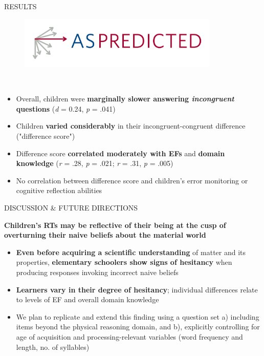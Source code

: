\documentclass[final]{beamer}
\newlength{\colwidth}
\newlength{\widecolwidth}
\begin{document}
\begin{frame}[t]
\begin{columns}[t]
\begin{column}{\widecolwidth}
\begin{block}{RESULTS}
\begin{minipage}{0.45\textwidth}
\begin{figure}
      \href{https://aspredicted.org/DJG_YWR}{\includegraphics[height=2.5cm]{images/aspredicted.png}}\\[2ex]
\end{figure}
\\[2ex]
    \begin{itemize}
        \item Overall, children were \textbf{marginally slower answering \emph{incongruent} questions} (\emph{d}  = 0.24, \emph{p} = .041)
        \item Children \textbf{varied considerably} in their incongruent-congruent difference ("difference score")
        \item Difference score \textbf{correlated moderately with EFs} and \textbf{domain knowledge} (\emph{r} = .28, \emph{p} = .021; \emph{r} = .31, \emph{p} = .005)
        \item No correlation between difference score and children's error monitoring or cognitive reflection abilities
    \end{itemize}
\end{minipage}
\end{block}
    
\begin{block}{DISCUSSION \& FUTURE DIRECTIONS}
	\begin{tcolorbox}[
		colback=mycolor,
		colframe=mycolor,
		coltext=white,
		boxsep=2pt,
		left=2mm,
		right=2mm,
		top=2mm,
		bottom=2mm,
		arc=5mm,
		auto outer arc,
		boxrule=4pt,
		width=\dimexpr\linewidth-2\fboxsep\relax,
		]
		\centering
		\textbf{Children's RTs may be reflective of their being at the cusp of overturning their naive beliefs about the material world}
	\end{tcolorbox}
	
    \begin{itemize}
      \item \textbf{Even before acquiring a scientific understanding} of matter and its properties, \textbf{elementary schoolers show signs of hesitancy} when producing responses invoking incorrect naive beliefs
      \item \textbf{Learners vary in their degree of hesitancy}; individual differences relate to levels of EF and overall domain knowledge
      \item We plan to replicate and extend this finding using a question set a) including items beyond the physical reasoning domain, and b), explicitly controlling for age of acquisition and processing-relevant variables (word frequency and length, no. of syllables)
    \end{itemize}
\end{block}


\end{column}
\end{columns}
\end{frame}
\end{document}
